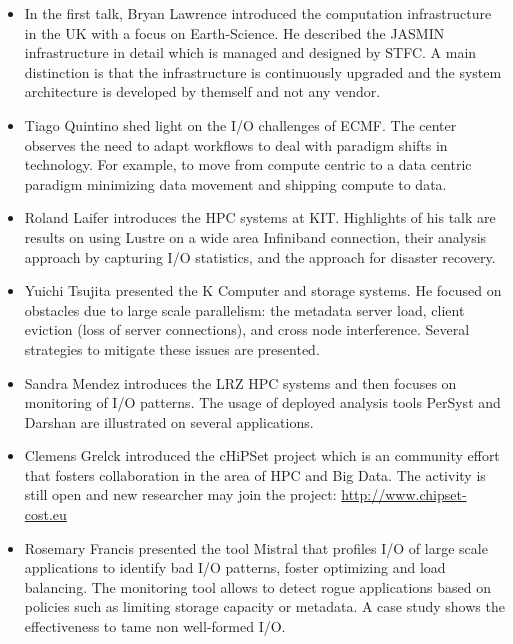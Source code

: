 \documentclass{llncs}
\begin{document}
\begin{itemize}
\item
In the first talk, Bryan Lawrence introduced the computation infrastructure in the UK with a focus on Earth-Science.
He described the JASMIN infrastructure in detail which is managed and designed by STFC.
A main distinction is that the infrastructure is continuously upgraded and the system architecture is developed by themself and not any vendor.

\item Tiago Quintino shed light on the I/O challenges of ECMF.
The center observes the need to adapt workflows to deal with paradigm shifts in technology.
For example, to move from compute centric to a data centric paradigm minimizing data movement and shipping compute to data.

\item Roland Laifer introduces the HPC systems at KIT.
Highlights of his talk are results on using Lustre on a wide area Infiniband connection, their analysis approach by
capturing I/O statistics, and the approach for disaster recovery.

\item Yuichi Tsujita presented the K Computer and storage systems.
He focused on obstacles due to large scale parallelism: the metadata server load, client eviction (loss of server connections), and cross node interference.
Several strategies to mitigate these issues are presented.

\item Sandra Mendez introduces the LRZ HPC systems and then focuses on monitoring of I/O patterns.
The usage of deployed analysis tools PerSyst and Darshan are illustrated on several applications.

\item Clemens Grelck introduced the cHiPSet project which is an community effort that fosters collaboration in the area of HPC and Big Data.
The activity is still open and new researcher may join the project:
\url{http://www.chipset-cost.eu}

\item Rosemary Francis presented the tool Mistral that profiles I/O of large scale applications to identify bad I/O patterns, foster optimizing and load balancing.
The monitoring tool allows to detect rogue applications based on policies such as limiting storage capacity or metadata.
A case study shows the effectiveness to tame non well-formed I/O.


\end{itemize}
\end{document}
